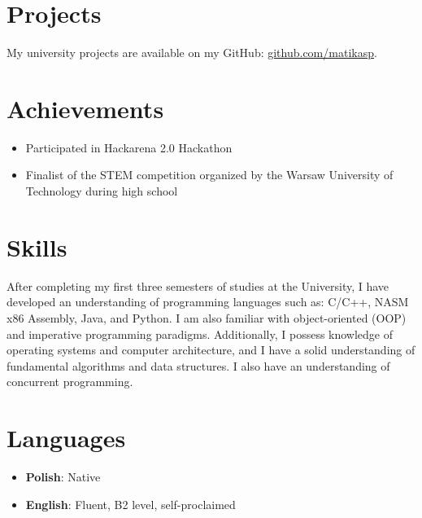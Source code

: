 \documentclass[a4paper,10pt]{article}
\begin{document}
\section*{Projects}
My university projects are available on my GitHub: \href{https://github.com/matikasp}{github.com/matikasp}.

\section*{Achievements}
\begin{itemize}[left=0pt]
    \item Participated in Hackarena 2.0 Hackathon
    \item Finalist of the STEM competition organized by the Warsaw University of Technology during high school
\end{itemize}

\section*{Skills}
After completing my first three semesters of studies at the University, I have developed an understanding of programming languages such as: C/C++, NASM x86 Assembly, Java, and Python. I am also familiar with object-oriented (OOP) and imperative programming paradigms. Additionally, I possess knowledge of operating systems and computer architecture, and I have a solid understanding of fundamental algorithms and data structures. I also have an understanding of concurrent programming.

\section*{Languages}
\begin{itemize}[left=0pt]
    \item \textbf{Polish}: Native
    \item \textbf{English}: Fluent, B2 level, self-proclaimed
\end{itemize}
\end{document}
